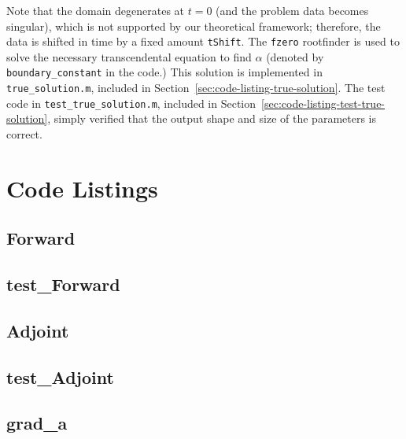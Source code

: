 \documentclass[letterpaper, 10pt]{amsart}
\theoremstyle{definition}
\theoremstyle{remark}
\begin{document}
{Note that the domain degenerates at $t=0$ (and the problem data becomes singular), which is not supported by our theoretical framework; therefore, the data is shifted in time by a fixed amount \verb+tShift+.
The \verb+fzero+ rootfinder is used to solve the necessary transcendental equation to find $\alpha$ (denoted by \verb+boundary_constant+ in the code.)
This solution is implemented in \verb+true_solution.m+, included in Section~\ref{sec:code-listing-true-solution}.
The test code in \verb+test_true_solution.m+, included in Section~\ref{sec:code-listing-test-true-solution}, simply verified that the output shape and size of the parameters is correct.


\appendix
\section{Code Listings}
{\small 
\subsection{Forward}\label{sec:code-listing-forward}


\subsection{test\_Forward}\label{sec:code-listing-test-forward}


\subsection{Adjoint}\label{sec:code-listing-adjoint}


\subsection{test\_Adjoint}\label{sec:code-listing-test-adjoint}


\subsection{grad\_a}\label{sec:code-listing-grad-s}


}}
\end{document}
